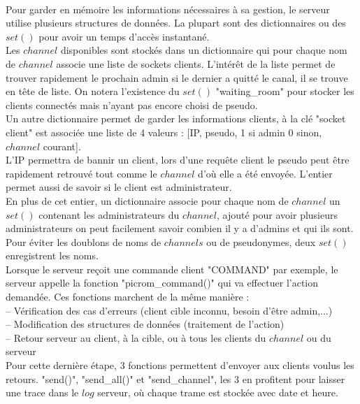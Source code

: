 \documentclass[12pt]{article}
\begin{document}
\\Pour garder en mémoire les informations nécessaires à sa gestion, le serveur utilise plusieurs
structures de données. La plupart sont des dictionnaires ou des $set()$ pour avoir un temps
d'accès instantané.
\\Les $channel$ disponibles sont stockés dans un dictionnaire qui pour chaque nom de $channel$
associe une liste de sockets clients. L'intérêt de la liste permet de trouver rapidement
le prochain admin si le dernier a quitté le canal, il se trouve en tête de liste.
On notera l'existence du $set()$ "waiting\_room" pour stocker les clients connectés mais n'ayant pas
encore choisi de pseudo.
\\Un autre dictionnaire permet de garder les informations clients, à la clé "socket client"
est associée une liste de 4 valeurs : [IP, pseudo, 1 si admin 0 sinon, $channel$ courant].
\\L'IP permettra de bannir un client, lors d'une requête client le pseudo peut être rapidement retrouvé tout comme le 
$channel$ d'où elle a été envoyée. L'entier permet aussi de savoir si le client est administrateur.
\\En plus de cet entier, un dictionnaire associe pour chaque nom de $channel$ un $set()$
contenant les administrateurs du $channel$, ajouté pour avoir plusieurs administrateurs on
peut facilement savoir combien il y a d'admins et qui ils sont.
\\Pour éviter les doublons de noms de $channels$ ou de pseudonymes, deux $set()$ enregistrent
les noms.
\\

Lorsque le serveur reçoit une commande client "COMMAND" par exemple, le serveur appelle
la fonction "picrom\_command()" qui va effectuer l'action demandée. Ces fonctions marchent de la même manière :
\\-- Vérification des cas d'erreurs (client cible inconnu, besoin d'être admin,...)
\\-- Modification des structures de données (traitement de l'action)
\\-- Retour serveur au client, à la cible, ou à tous les clients du $channel$ ou du serveur
\\Pour cette dernière étape, 3 fonctions permettent d'envoyer aux clients voulus les retours.
"send()",
"send\_all()" et "send\_channel", les 3 en profitent pour laisser une trace dans le $log$ serveur, où chaque trame est stockée avec date et heure.
\\
\end{document}
